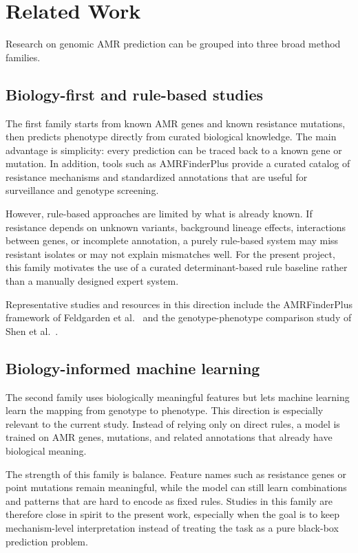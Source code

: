 \section{Related Work}

Research on genomic AMR prediction can be grouped into three broad method families.

\subsection{Biology-first and rule-based studies}

The first family starts from known AMR genes and known resistance mutations, then predicts phenotype directly from curated biological knowledge. The main advantage is simplicity: every prediction can be traced back to a known gene or mutation. In addition, tools such as AMRFinderPlus provide a curated catalog of resistance mechanisms and standardized annotations that are useful for surveillance and genotype screening.

However, rule-based approaches are limited by what is already known. If resistance depends on unknown variants, background lineage effects, interactions between genes, or incomplete annotation, a purely rule-based system may miss resistant isolates or may not explain mismatches well. For the present project, this family motivates the use of a curated determinant-based rule baseline rather than a manually designed expert system.

Representative studies and resources in this direction include the AMRFinderPlus framework of Feldgarden et al.~\citep{feldgarden2021amrfinderplus} and the genotype-phenotype comparison study of Shen et al.~\citep{shen2024comparison}.

\subsection{Biology-informed machine learning}

The second family uses biologically meaningful features but lets machine learning learn the mapping from genotype to phenotype. This direction is especially relevant to the current study. Instead of relying only on direct rules, a model is trained on AMR genes, mutations, and related annotations that already have biological meaning.

The strength of this family is balance. Feature names such as resistance genes or point mutations remain meaningful, while the model can still learn combinations and patterns that are hard to encode as fixed rules. Studies in this family are therefore close in spirit to the present work, especially when the goal is to keep mechanism-level interpretation instead of treating the task as a pure black-box prediction problem.


